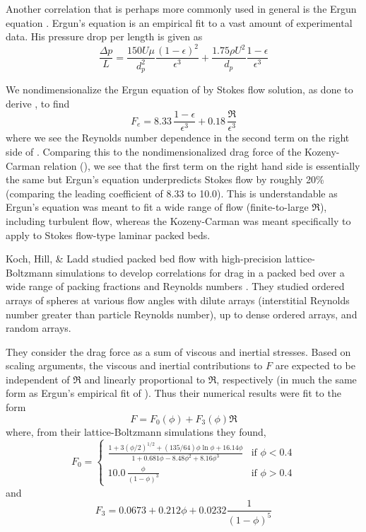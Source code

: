 Another correlation that is perhaps more commonly used in general is the Ergun equation \cite{ergun1952fluid}. Ergun's equation is an empirical fit to a vast amount of experimental data. His pressure drop per length is given as
\begin{equation}\label{eq:ergun-pressure}
    \frac{\Delta p}{L} = \frac{150 U \mu}{d_p^2} \frac{(1-\epsilon)^2}{\epsilon^3} + \frac{1.75 \rho U^2}{d_p}\frac{1-\epsilon}{\epsilon^3}
\end{equation}

We nondimensionalize the Ergun equation of  by Stokes flow solution, as done to derive , to find
\begin{equation}\label{eq:ergun-non-dim}
    F_e = 8.33 \, \frac{1-\epsilon}{\epsilon^3} + 0.18 \, \frac{\Re}{\epsilon^3}
\end{equation}
where we see the Reynolds number dependence in the second term on the right side of . Comparing this to the nondimensionalized drag force of the Kozeny-Carman relation (), we see that the first term on the right hand side is essentially the same but Ergun's equation underpredicts Stokes flow by roughly 20\% (comparing the leading coefficient of 8.33 to 10.0). This is understandable as Ergun's equation was meant to fit a wide range of flow (finite-to-large $\Re$), including turbulent flow, whereas the Kozeny-Carman was meant specifically to apply to Stokes flow-type laminar packed beds.

Koch, Hill, \& Ladd studied packed bed flow with high-precision lattice-Boltzmann simulations to develop correlations for drag in a packed bed over a wide range of packing fractions and Reynolds numbers \cite{Koch2001,Hill2001a,Hill2001}. They studied ordered arrays of spheres at various flow angles with dilute arrays (interstitial Reynolds number greater than particle Reynolds number), up to dense ordered arrays, and random arrays.

They consider the drag force as a sum of viscous and inertial stresses. Based on scaling arguments, the viscous and inertial contributions to $F$ are expected to be independent of $\Re$ and linearly proportional to $\Re$, respectively (in much the same form as Ergun's empirical fit of ). Thus their numerical results were fit to the form
\begin{equation}\label{eq:khl-non-dim}
    F = F_0(\phi) + F_3(\phi)\Re
\end{equation}
where, from their lattice-Boltzmann simulations they found,
\begin{equation}\label{eq:khl-f0}
F_0 = \begin{cases}
    \frac{1+3(\phi/2)^{1/2} + (135/64)\phi\ln\phi + 16.14\phi}{1 + 0.681\phi - 8.48 \phi^2 + 8.16\phi^3} & \text{if $\phi < 0.4$}\\
    10.0\,\frac{\phi}{(1-\phi)^3} & \text{if $\phi > 0.4$} 
    \end{cases}
\end{equation}
and
\begin{equation}\label{eq:khl-f3}
    F_3 = 0.0673 + 0.212\phi + 0.0232 \frac{1}{(1-\phi)^5}
\end{equation}

